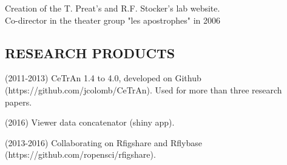 Creation of the T. Preat's and R.F. Stocker's lab website.
\\
Co-director in the theater group "les apostrophes" in
2006


%

\newpage

%
\subsection*{RESEARCH PRODUCTS}



\begin{itemize}
\begin{sloppypar}
%
\item(2011-2013) CeTrAn 1.4 to 4.0, 
developed on Github (https://github.com/jcolomb/CeTrAn).
Used for more than three research papers.

\item(2016) Viewer data concatenator (shiny app).

\item(2013-2016) Collaborating on Rfigshare and Rflybase (https://github.com/ropensci/rfigshare).

%
%
\end{sloppypar}
\end{itemize}


